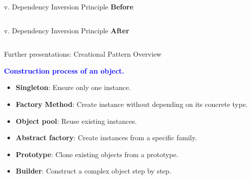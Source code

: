 \documentclass[13pt]{beamer}
\begin{document}
\begin{frame}{v. Dependency Inversion Principle}
\textbf{Before}
\begin{columns}[T]
\begin{column}{.48\textwidth}


\end{column}
\begin{column}{.48\textwidth}

\end{column}
\end{columns}
\end{frame}

\begin{frame}{v. Dependency Inversion Principle}
\textbf{After}
\begin{columns}[T]
\begin{column}{.48\textwidth}


\end{column}
\begin{column}{.48\textwidth}

\end{column}
\end{columns}
\end{frame}

\begin{frame}{Further presentations: Creational Pattern Overview}
	\begin{center}
		\textcolor{blue}{\textbf{Construction process of an object.}}
	\end{center}
	
	\begin{itemize}
		\setlength\itemsep{1em}
		\item \textbf{Singleton}: Ensure only one instance.
		\item \textbf{Factory Method}: Create instance without depending on its concrete type.
		\item \textbf{Object pool}: Reuse existing instances.
		\item \textbf{Abstract factory}: Create instances from a specific family.
		\item \textbf{Prototype}: Clone existing objects from a prototype.
		\item \textbf{Builder}: Construct a complex object step by step.
	\end{itemize}
\end{frame}
\end{document}
